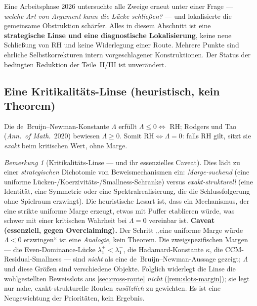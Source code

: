 \documentclass[12pt,a4paper]{article}
\theoremstyle{definition}
\theoremstyle{remark}
\newtheorem{remark}[theorem]{Bemerkung}
\begin{document}
Eine Arbeitsphase 2026 untersuchte alle Zweige erneut unter einer Frage ---
\emph{welche Art von Argument kann die Lücke schließen?} --- und lokalisierte die
gemeinsame Obstruktion schärfer. Alles in diesem Abschnitt ist eine
\textbf{strategische Linse und eine diagnostische Lokalisierung}, keine neue
Schließung von RH und keine Widerlegung einer Route. Mehrere Punkte sind ehrliche
Selbstkorrekturen intern vorgeschlagener Konstruktionen. Der Status der bedingten
Reduktion der Teile~II/III ist unverändert.

\subsection{Eine Kritikalitäts-Linse (heuristisch, kein Theorem)}
\label{sec:lambda-lens}

Die de~Bruijn--Newman-Konstante $\Lambda$ erfüllt $\Lambda\le 0\Leftrightarrow$ RH;
Rodgers und Tao (\emph{Ann.\ of Math.}\ 2020) bewiesen $\Lambda\ge 0$. Somit
$\mathrm{RH}\Leftrightarrow\Lambda=0$: falls RH gilt, sitzt sie \emph{exakt} beim
kritischen Wert, ohne Marge.

\begin{remark}[Kritikalitäts-Linse --- und ihr essenzielles Caveat]
\label{rem:lambda-caveat}
Dies lädt zu einer \emph{strategischen} Dichotomie von Beweismechanismen ein:
\emph{Marge-suchend} (eine uniforme Lücken-/Koerzivitäts-/Smallness-Schranke) versus
\emph{exakt-strukturell} (eine Identität, eine Symmetrie oder eine
Spektralrealisierung, die die Schlussfolgerung ohne Spielraum erzwingt). Die
heuristische Lesart ist, dass ein Mechanismus, der eine strikte uniforme Marge
erzeugt, etwas mit Puffer etablieren würde, was schwer mit einer kritischen Wahrheit
bei $\Lambda=0$ vereinbar ist.
\textbf{Caveat (essenziell, gegen Overclaiming).} Der Schritt ,,eine uniforme Marge
würde $\Lambda<0$ erzwingen`` ist eine \emph{Analogie}, kein Theorem. Die
zweigspezifischen Margen --- die Even-Dominance-Lücke $\lambda_1^+<\lambda_1^-$, die
Hadamard-Konstante $\kappa$, die CCM-Residual-Smallness --- sind \emph{nicht} als
eine de~Bruijn--Newman-Aussage gezeigt; $\Lambda$ und diese Größen sind
verschiedene Objekte. Folglich widerlegt die Linse die wohlgestellten Beweisslots
aus \cref{sec:cross-route} \emph{nicht} (\cref{rem:slots-margin}); sie legt nur nahe,
exakt-strukturelle Routen \emph{zusätzlich} zu gewichten. Es ist eine Neugewichtung
der Prioritäten, kein Ergebnis.
\end{remark}
\end{document}

